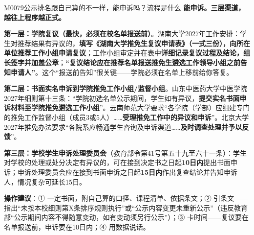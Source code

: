\begin{qa}{M0079}{公示排名跟自己算的不一样，能申诉吗？流程是什么}
\textbf{能申诉。三层渠道，越往上程序越正式。}

\textbf{第一层：学院复议（最快，必须在校名单报送前）}。湖南大学2027年工作安排：学生对推荐结果有异议的，\textbf{填写《湖南大学推免生复议申请表》（一式三份），向所在单位推荐工作小组申请复议}；工作小组审定并在表中\textbf{详细记录复议过程及结论，组长签字并加盖公章}；\textbf{“复议结论应在推荐名单报送推免生遴选工作领导小组之前告知申请人”}。这个“报送前告知”很关键——学院必须在名单上移前给你答复。

\textbf{第二层：书面实名申诉到学院推免工作小组/监督小组}。山东中医药大学中医学院2027年细则第十三条：“学院初选名单公示期间，学生如有异议，\textbf{提交实名书面申诉材料至学院推免遴选工作小组}”。云南师范大学要求“各学院（学部）应组建专门的推免工作监督小组（成员3或5人）……\textbf{受理推免工作中的异议和申诉}”。北京大学2027年推免办法要求“各院系应畅通学生咨询及申诉渠道……\textbf{及时调查处理并予以反馈}”。

\textbf{第三层：学校学生申诉处理委员会}（教育部令第41号第五十九至六十一条）：学生对学校的处理或处分决定有异议的，可在接到决定书之日起\textbf{10日内}提出书面申诉；申诉处理委员会应在接到书面申诉之日起\textbf{15日内}作出复查结论并告知申诉人，情况复杂可延长15日。

\textbf{操作建议}：① 一定书面，附自己算的口径、课程清单、依据条文；② 引条文——指出“未按本校细则第X条排序规则执行”或“公示内容变更未重新公示”（违反教育部“公示期间内容不得随意变动，如有变动须另行公示”）；③ 卡时间——复议要在名单报送前，申诉要在10日内；④ 用数据说话。
\end{qa}

